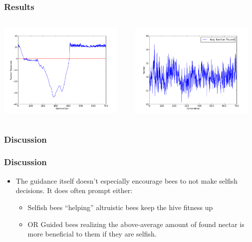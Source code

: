 \documentclass{beamer}
\begin{document}
        \begin{frame}[c]\frametitle{Results}
          \begin{columns}
          \begin{column}{0.48\textwidth}
            \includegraphics[width=6cm]{results/gossip_bees_nectar.png}
          \end{column}
          \begin{column}{0.48\textwidth}
            \includegraphics[width=6cm]{results/gossip_bees_found_nectar.png}
          \end{column}
          \end{columns}
        \end{frame}

              

      \subsubsection{Discussion} %
      \label{ssub:discussion}
        \begin{frame}[c]\frametitle{Discussion}
          \begin{itemize}
            \item The guidance itself doesn't especially encourage bees to not
                  make selfish decisions. It does often prompt either:
                \begin{itemize}
                  \item Selfish bees ``helping'' altruistic bees keep the hive
                        fitness up
                  \item OR Guided bees realizing the above-average amount of 
                        found nectar is more beneficial to them if they are 
                        selfish.
                \end{itemize}
          \end{itemize}
        \end{frame}
\end{document}
